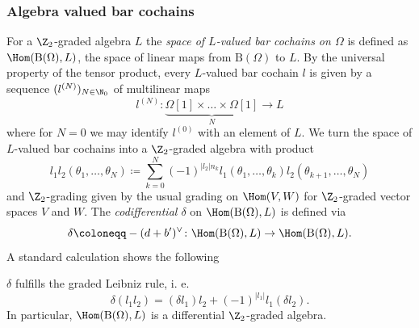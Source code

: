 \documentclass[a4paper, english, 12pt, bibliography=totocnumbered,
index=totoc]{scrartcl}
\begin{document}
\subsubsection{Algebra valued bar cochains}
For a $\Z_2$-graded algebra $L$ the \textit{space of $L$-valued bar
cochains on $\Omega$} is defined as $\Hom(\mathrm{B}(\Omega), L)$, the space 
of linear maps from $\mathrm{B}(\Omega)$ to $L$.
By the universal property of the tensor product, every $L$-valued bar cochain
$l$ is given by a sequence $(l^{(N)})_{N \in \N_0}$ of multilinear maps
\begin{equation*}
	l^{(N)} \colon \underbrace{\Omega[1] \times \ldots \times \Omega[1]}_N
	\to L
\end{equation*}
where for $N = 0$ we may identify $l^{(0)}$ with an element of $L$.
We turn the space of $L$-valued bar cochains into a $\Z_2$-graded algebra with
product
\begin{equation}\label{Product bar cochains}
	l_1 l_2 (\theta_1, \ldots, \theta_N) \coloneqq \sum_{k=0}^N (-1)^{\lvert
		l_2 \rvert n_k} l_1(\theta_1, \ldots, \theta_k) l_2 (\theta_{k+1},
	\ldots,
	\theta_N)
\end{equation}
and $\Z_2$-grading given by the usual grading on $\Hom(V, W)$ for
$\Z_2$-graded
vector spaces $V$ and $W$.
The \textit{codifferential $\delta$} on $\Hom(\mathrm{B}(\Omega), L)$ is
defined via
\begin{equation*}
	\delta \coloneqq - (d+b')^{\vee} \colon \Hom(\mathrm{B}(\Omega), L) \to
	\Hom(\mathrm{B}(\Omega), L).
\end{equation*}
A standard calculation shows the following
\begin{lem}
	$\delta$ fulfills the graded Leibniz rule, i. e.
	\begin{equation}\label{Z2 graded Leibniz delta}
		\delta(l_1 l_2) = (\delta l_1)l_2 + (-1)^{\lvert l_1 \rvert} l_1
		(\delta
		l_2).
	\end{equation}
	In particular, $\Hom(\mathrm{B}(\Omega), L)$ is a differential
	$\Z_2$-graded algebra.
\end{lem}
\end{document}

